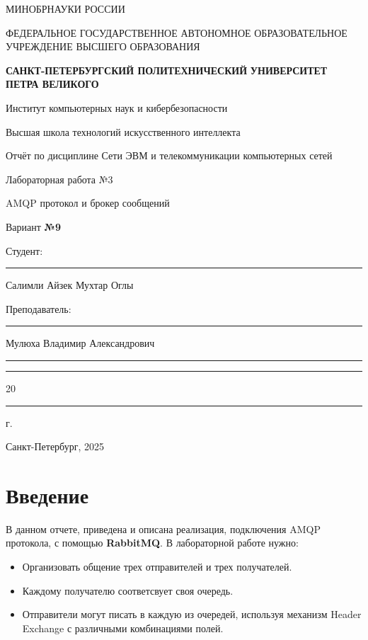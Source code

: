 \documentclass[areasetadvanced]{scrartcl}
\begin{document}
\sloppy
	\thispagestyle{empty}
	\begin{center}
		\large{МИНОБРНАУКИ РОССИИ} \par
		\vspace{0.3cm}
		\normalsize
		{ФЕДЕРАЛЬНОЕ ГОСУДАРСТВЕННОЕ АВТОНОМНОЕ ОБРАЗОВАТЕЛЬНОЕ УЧРЕЖДЕНИЕ ВЫСШЕГО ОБРАЗОВАНИЯ} \par
		\vspace{0.3cm}
		\textbf{\guillemotleft САНКТ-ПЕТЕРБУРГСКИЙ ПОЛИТЕХНИЧЕСКИЙ}
		\textbf{УНИВЕРСИТЕТ ПЕТРА ВЕЛИКОГО\guillemotright} \par
		\vspace{0.3cm}
		{Институт компьютерных наук и кибербезопасности}\par
		{Высшая школа технологий искусственного интеллекта}\par
	\end{center}
	\vfill
	\begin{center}
		{\large Отчёт по дисциплине \guillemotleft Сети ЭВМ и телекоммуникации компьютерных сетей\guillemotright}\par
		{\huge   Лабораторная работа №3
		
		\guillemotleft AMQP протокол и брокер сообщений\guillemotright}\par
            {\huge Вариант \textbf{№9}}
         
	\end{center}
	\vfill
	\begin{flushleft}
		Студент: \hspace{1.8cm} \rule[0pt]{2.5cm}{0.5pt}\hfill Салимли Айзек Мухтар Оглы\par
		\vspace{1.5cm}
		Преподаватель: \hspace{0.55cm} \rule[0pt]{2.5cm}{0.5pt}\hfill  Мулюха Владимир Александрович
	\end{flushleft}
	\vspace{0.5cm}
	\begin{flushright}
		\guillemotleft \rule[0pt]{0.8cm}{0.5pt}\guillemotright \rule[0pt]{2cm}{0.5pt} 20\rule[0pt]{0.5cm}{0.5pt} г.
	\end{flushright}
	\vfill
	\begin{center}
		Санкт-Петербург, 2025
	\end{center}
	\newpage
	\tableofcontents
	\newpage
\section*{Введение}
В данном отчете, приведена и описана реализация, подключения AMQP протокола, с помощью \textbf{RabbitMQ}. 
В лабораторной работе нужно: 
\begin{itemize}
	\item Организовать общение трех отправителей и трех получателей.
	\item Каждому получателю соответсвует своя очередь.
	\item Отправители могут писать в каждую из очередей, используя механизм Header Exchange с различными комбинациями полей.
\end{itemize}
\end{document}
